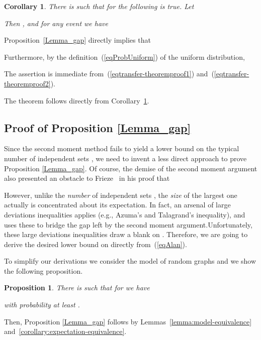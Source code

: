\documentclass[a4paper,10pt]{article}
\makeatletter
\newtheorem{proposition}{Proposition}\renewcommand{\theproposition}{\arabic{proposition}}
\newtheorem{corollary}{Corollary}\renewcommand{\thecorollary}{\arabic{corollary}}
\newenvironment{proof}{\noindent{\bf Proof\@:}}{\hfill \\}
\newenvironment{theoremproof}[1]{\noindent{\bf Proof of Theorem #1\@:}}{\hfill \\}
\newcommand\Prop{Proposition}
\newcommand\Cor{Corollary}
\makeatother
\begin{document}
\begin{corollary}\label{Cor_quantexchange}
There is  such that for  the following is true.
Let

Then , and for any event  we have
	
\end{corollary}
\begin{proof}
\Prop~\ref{Lemma_gap} directly implies that
	
Furthermore, by the definition~(\ref{eqProbUniform}) of the uniform distribution, 
	
The assertion is immediate from~(\ref{eqtransfer-theoremproof1}) and~(\ref{eqtransfer-theoremproof2}).
\end{proof}

\smallskip
\begin{theoremproof}{\ref{thrm:transfer-theorem}}
The theorem follows directly from \Cor~\ref{Cor_quantexchange}.
\end{theoremproof}


\subsection{Proof of Proposition \ref{Lemma_gap}}\label{section:concentration}

Since the second moment method fails to yield a lower bound on
the typical number  of independent sets , we
need to invent a less direct approach to prove Proposition \ref{Lemma_gap}.
Of course, the demise of the second moment argument also presented
an obstacle to Frieze~\cite{frieze-is} in his proof that
		
However, unlike the \emph{number}  of independent
sets , the \emph{size}  of the largest one actually
is concentrated about its expectation. In fact, an arsenal of large
deviations inequalities applies (e.g., Azuma's and Talagrand's
inequality), and~\cite{frieze-is} uses these to bridge the gap
left by the second moment argument.Unfortunately, these large
deviations inequalities draw a blank on . Therefore,
we are going to derive the desired lower bound on 
directly from~(\ref{eqAlan}).


To simplify our derivations we consider the model of random graphs
 and we show the following proposition.
\begin{proposition}\label{proposition:star-conctration}
There is  such that for  we 
have


with probability at least .
\end{proposition}
Then, Proposition \ref{Lemma_gap} follows by Lemmas~\ref{lemma:model-equivalence}
and~\ref{corollary:expectation-equivalence}.
\end{document}
